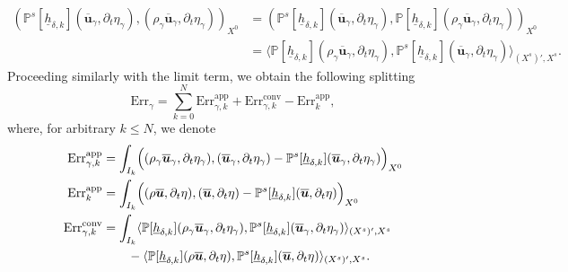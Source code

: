 \documentclass[11pt]{article}
\newcommand{\app}{\mathrm{app}}
\newcommand{\conv}{\mathrm{conv}}
\newcommand{\Err}{\mathrm{Err}}
\theoremstyle{remark}
\theoremstyle{definition}
\newcommand{\ug}{\boldsymbol{u}}
\newcommand{\hb}{{\underline{h}}}
\begin{document}
\begin{align*}
( \mathbb{P}^{s}[\hb_{\delta, k}](\overline{\ug}_{\gamma},\partial_{t}\eta_{\gamma}),(\rho_{\gamma} \overline{\ug}_{\gamma},\partial_t \eta_{\gamma}))_{X^0}
& \!=\! ( \mathbb{P}^{s}[\hb_{\delta, k}](\overline{\ug}_{\gamma},\partial_{t}\eta_{\gamma}),\mathbb P[\hb_{\delta,k}](\rho_{\gamma} \overline{\ug}_{\gamma},\partial_t \eta_{\gamma}))_{X^0} \\
& \!=\! \langle \mathbb P[\hb_{\delta,k}](\rho_{\gamma} \overline{\ug}_{\gamma},\partial_t \eta_{\gamma}), \mathbb{P}^{s}[\hb_{\delta, k}](\overline{\ug}_{\gamma},\partial_{t}\eta_{\gamma}) \rangle_{(X^s)',X^s}.
\end{align*}
Proceeding similarly with the limit term, we obtain the following splitting
\[
\Err_{\gamma} = \sum_{k=0}^N \Err^{\app}_{\gamma,k} + \Err^{\conv}_{\gamma,k} - \Err^{\app}_{k},
\]
where, for arbitrary $k \leq N$, we denote
\begin{align*}
\Err^{\app}_{\gamma,k} & = \int_{I_{k}} \Bigl( (\rho_{\gamma} \overline{\ug}_{\gamma},\partial_t \eta_{\gamma}),( \overline{\ug}_{\gamma},\partial_t \eta_{\gamma})- \mathbb{P}^{s}[\hb_{\delta, k}](\overline{\ug}_{\gamma},\partial_{t}\eta_{\gamma})\Bigr)_{X^0} \\
\Err^{\app}_{k} &= \int_{I_{k}} \Bigl( (\rho \overline{\ug},\partial_t \eta),( \overline{\ug},\partial_t \eta)- \mathbb{P}^{s}[\hb_{\delta, k}](\overline{\ug},\partial_{t}\eta)\Bigr)_{X^0}\\
\Err^{\conv}_{\gamma,k} &= \int_{I_k} \langle \mathbb P[\hb_{\delta,k}](\rho_{\gamma} \overline{\ug}_{\gamma},\partial_t \eta_{\gamma}), \mathbb{P}^{s}[\hb_{\delta, k}](\overline{\ug}_{\gamma},\partial_{t}\eta_{\gamma}) \rangle_{(X^s)',X^s} \\
& \qquad
- \langle \mathbb P[\hb_{\delta,k}](\rho \overline{\ug},\partial_t \eta), \mathbb{P}^{s}[\hb_{\delta, k}](\overline{\ug},\partial_{t}\eta) \rangle_{(X^s)',X^s}.
\end{align*}
\end{document}
